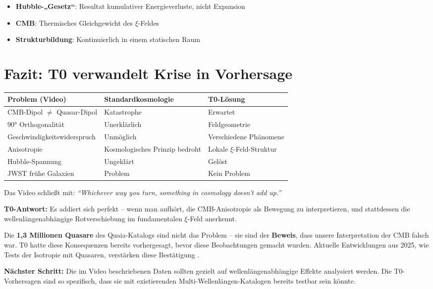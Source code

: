\documentclass{article}
\begin{document}
	\begin{itemize}
		\item \textbf{Hubble-„Gesetz“}: Resultat kumulativer Energieverluste, nicht Expansion
		\item \textbf{CMB}: Thermisches Gleichgewicht des $\xi$-Feldes
		\item \textbf{Strukturbildung}: Kontinuierlich in einem statischen Raum
	\end{itemize}
	
	\section{Fazit: T0 verwandelt Krise in Vorhersage}
	
	\begin{tabular}{p{3.5cm}|p{6cm}|p{5.5cm}}
		\textbf{Problem (Video)} & \textbf{Standardkosmologie} & \textbf{T0-Lösung} \\
		\hline
		CMB-Dipol $\neq$ Quasar-Dipol & Katastrophe \cite{mittal2024} & Erwartet \\
		90° Orthogonalität & Unerklärlich \cite{secrest2024} & Feldgeometrie \\
		Geschwindigkeitswiderspruch & Unmöglich & Verschiedene Phänomene \\
		Anisotropie & Kosmologisches Prinzip bedroht & Lokale $\xi$-Feld-Struktur \\
		Hubble-Spannung & Ungeklärt & Gelöst \\
		JWST frühe Galaxien & Problem & Kein Problem \\
	\end{tabular}
	
	Das Video schließt mit: \textit{``Whichever way you turn, something in cosmology doesn't add up.''}
	
	\textbf{T0-Antwort:} Es addiert sich perfekt -- wenn man aufhört, die CMB-Anisotropie als Bewegung zu interpretieren, und stattdessen die wellenlängenabhängige Rotverschiebung im fundamentalen $\xi$-Feld anerkennt.
	
	Die \textbf{1,3 Millionen Quasare} des Quaia-Katalogs sind nicht das Problem -- sie sind der \textbf{Beweis}, dass unsere Interpretation der CMB falsch war. T0 hatte diese Konsequenzen bereits vorhergesagt, bevor diese Beobachtungen gemacht wurden. Aktuelle Entwicklungen aus 2025, wie Tests der Isotropie mit Quasaren, verstärken diese Bestätigung \cite{sarkar2025}.
	
	\textbf{Nächster Schritt:} Die im Video beschriebenen Daten sollten gezielt auf wellenlängenabhängige Effekte analysiert werden. Die T0-Vorhersagen sind so spezifisch, dass sie mit existierenden Multi-Wellenlängen-Katalogen bereits testbar sein könnte.
	
\end{document}
